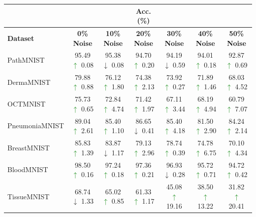 \documentclass{article}
\theoremstyle{plain}
\theoremstyle{definition}
\theoremstyle{remark}
\begin{document}
\begin{table}[h]
\centering
\footnotesize{
\centering
{
\begin{tabular}{l|cccccc}
\hline
 & & & \textbf{Acc. (\%)} & & & \\
\hline
\textbf{Dataset} & \textbf{0\% Noise} & \textbf{10\% Noise} & \textbf{20\% Noise} & \textbf{30\% Noise} & \textbf{40\% Noise} & \textbf{50\% Noise} \\
\hline
PathMNIST & 95.49 \textcolor{Green}{$\uparrow$} 0.08 & 95.38 \textcolor{BrickRed}{$\downarrow$} 0.08 & 94.70 \textcolor{Green}{$\uparrow$} 0.20 & 94.19 \textcolor{BrickRed}{$\downarrow$} 0.59 & 94.01 \textcolor{Green}{$\uparrow$} 0.18 & 92.87 \textcolor{Green}{$\uparrow$} 0.69 \\
\hline
DermaMNIST & 79.88 \textcolor{Green}{$\uparrow$} 0.88 & 76.12 \textcolor{Green}{$\uparrow$} 1.80 & 74.38 \textcolor{Green}{$\uparrow$} 2.13 & 73.92 \textcolor{Green}{$\uparrow$} 0.27 & 71.89 \textcolor{Green}{$\uparrow$} 1.46 & 68.03 \textcolor{Green}{$\uparrow$} 4.52 \\
\hline
OCTMNIST & 75.73 \textcolor{Green}{$\uparrow$} 0.65 & 72.84 \textcolor{Green}{$\uparrow$} 4.74 & 71.42 \textcolor{Green}{$\uparrow$} 1.97 & 67.11 \textcolor{Green}{$\uparrow$} 3.44 & 68.19 \textcolor{Green}{$\uparrow$} 4.94 & 60.79 \textcolor{Green}{$\uparrow$} 7.07 \\
\hline
PneumoniaMNIST & 89.04 \textcolor{Green}{$\uparrow$} 2.61 & 85.40 \textcolor{Green}{$\uparrow$} 1.10 & 86.65 \textcolor{BrickRed}{$\downarrow$} 0.41 & 85.40 \textcolor{Green}{$\uparrow$} 4.18 & 81.50 \textcolor{Green}{$\uparrow$} 2.90 & 84.24 \textcolor{Green}{$\uparrow$} 2.14 \\
\hline
BreastMNIST & 85.83 \textcolor{Green}{$\uparrow$} 1.39 & 83.87 \textcolor{BrickRed}{$\downarrow$} 1.17 & 79.13 \textcolor{Green}{$\uparrow$} 2.96 & 78.74 \textcolor{Green}{$\uparrow$} 0.39 & 74.78 \textcolor{Green}{$\uparrow$} 6.75 & 70.10 \textcolor{Green}{$\uparrow$} 4.34 \\
\hline
BloodMNIST & 98.50 \textcolor{Green}{$\uparrow$} 0.16 & 97.24 \textcolor{Green}{$\uparrow$} 0.18 & 97.36 \textcolor{Green}{$\uparrow$} 0.21 & 96.93 \textcolor{BrickRed}{$\downarrow$} 0.28 & 95.72 \textcolor{Green}{$\uparrow$} 0.71 & 94.72 \textcolor{Green}{$\uparrow$} 0.42 \\
\hline
TissueMNIST & 68.74 \textcolor{BrickRed}{$\downarrow$} 1.33 & 65.02 \textcolor{Green}{$\uparrow$} 0.85 & 61.33 \textcolor{Green}{$\uparrow$} 1.17 & \hspace{0.5em}45.08 \textcolor{Green}{$\uparrow$} 19.16 & \hspace{0.5em}38.50 \textcolor{Green}{$\uparrow$} 13.22 & \hspace{0.5em}31.82 \textcolor{Green}{$\uparrow$} 20.41 \\

\end{tabular}}}
\end{table}
\end{document}
